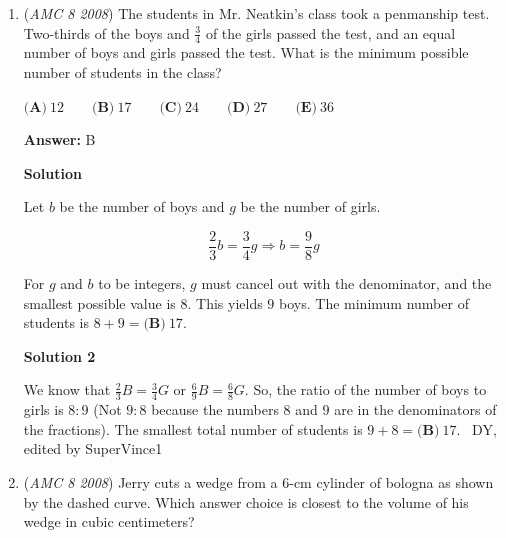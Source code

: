 \begin{enumerate}
\textbf{Solution 1}

The two points are one unit apart at $8$ places around the edge of the square. There are $8 \choose 2$$= 28$ ways to choose two points. The probability is

 
 \[\frac{8}{28} = \boxed{\textbf{(B)}\ \frac27}\]




\textbf{Solution 2}

Arbitrarily pick a point in the grid. Clearly, we see two options for the other point to be placed, so the answer is $\boxed{\textbf{(B)}\ \frac27}$.

 


	\item (\textit{AMC 8 2008}) The students in Mr. Neatkin's class took a penmanship test. Two-thirds of the boys and $\frac{3}{4}$ of the girls passed the test, and an equal number of boys and girls passed the test. What is the minimum possible number of students in the class?


 $\textbf{(A)}\ 12\qquad \textbf{(B)}\ 17\qquad \textbf{(C)}\ 24\qquad \textbf{(D)}\ 27\qquad \textbf{(E)}\ 36$

 \textbf{Answer: }B



\textbf{Solution}

Let $b$ be the number of boys and $g$ be the number of girls.

 
 \[\frac23 b = \frac34 g \Rightarrow b = \frac98 g\]

 For $g$ and $b$ to be integers, $g$ must cancel out with the denominator, and the smallest possible value is $8$. This yields $9$ boys. The minimum number of students is $8+9=\boxed{\textbf{(B)}\ 17}$.

 



\textbf{Solution 2}

We know that $\frac23 B = \frac34 G$  or  $\frac69 B = \frac68 G$. So, the ratio of the number of boys to girls is $8:9$ (Not $9:8$ because the numbers $8$ and $9$ are in the denominators of the fractions). The smallest total number of students is $9 + 8 = \boxed{\textbf{(B)}\ 17}$. ~DY, edited by SuperVince1

 


	\item (\textit{AMC 8 2008}) Jerry cuts a wedge from a $6$-cm cylinder of bologna as shown by the dashed curve. Which answer choice is closest to the volume of his wedge in cubic centimeters?


\end{enumerate}
